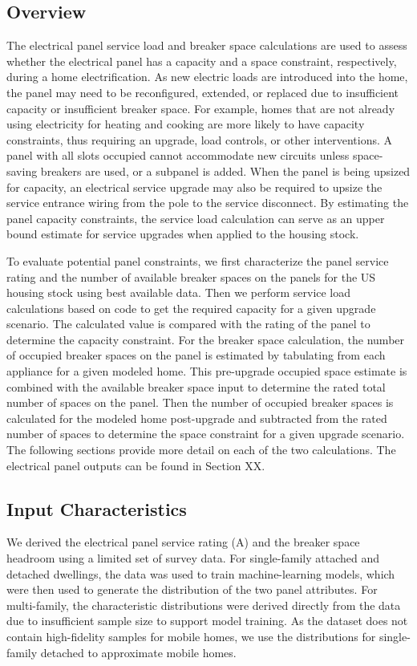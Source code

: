 \subsection{Overview}
The electrical panel service load and breaker space calculations are used to assess whether the electrical panel has a capacity and a space constraint, respectively, during a home electrification. As new electric loads are introduced into the home, the panel may need to be reconfigured, extended, or replaced due to insufficient capacity or insufficient breaker space. For example, homes that are not already using electricity for heating and cooking are more likely to have capacity constraints, thus requiring an upgrade, load controls, or other interventions. A panel with all slots occupied cannot accommodate new circuits unless space-saving breakers are used, or a subpanel is added. When the panel is being upsized for capacity, an electrical service upgrade may also be required to upsize the service entrance wiring from the pole to the service disconnect. By estimating the panel capacity constraints, the service load calculation can serve as an upper bound estimate for service upgrades when applied to the housing stock. 

To evaluate potential panel constraints, we first characterize the panel service rating and the number of available breaker spaces on the panels for the US housing stock using best available data. Then we perform service load calculations based on code to get the required capacity for a given upgrade scenario. The calculated value is compared with the rating of the panel to determine the capacity constraint. For the breaker space calculation, the number of occupied breaker spaces on the panel is estimated by tabulating from each appliance for a given modeled home. This pre-upgrade occupied space estimate is combined with the available breaker space input to determine the rated total number of spaces on the panel. Then the number of occupied breaker spaces is calculated for the modeled home post-upgrade and subtracted from the rated number of spaces to determine the space constraint for a given upgrade scenario. The following sections provide more detail on each of the two calculations. The electrical panel outputs can be found in Section XX.

\subsection{Input Characteristics}
We derived the electrical panel service rating (A) and the breaker space headroom using a limited set of survey data. For single-family attached and detached dwellings, the data was used to train machine-learning models, which were then used to generate the distribution of the two panel attributes. For multi-family, the characteristic distributions were derived directly from the data due to insufficient sample size to support model training. As the dataset does not contain high-fidelity samples for mobile homes, we use the distributions for single-family detached to approximate mobile homes.

